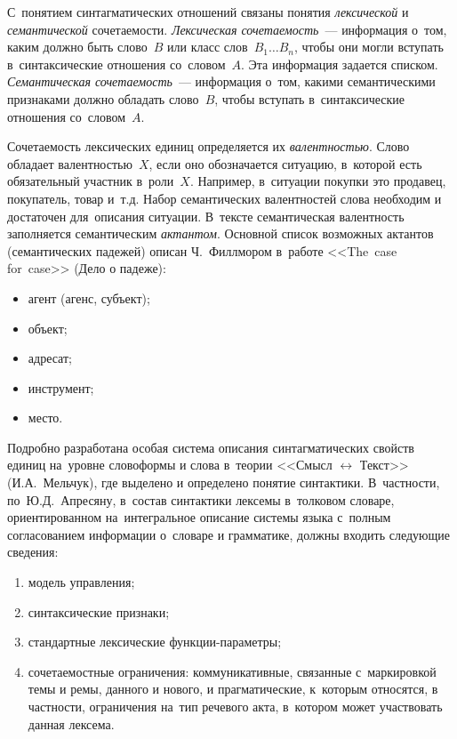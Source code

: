 \documentclass[12pt]{article}
\theoremstyle{definition}
\theoremstyle{remark}
\numberwithin{equation}{section}
\begin{document}
С~понятием синтагматических отношений связаны понятия \textsl{лексической}
и \textsl{семантической} сочетаемости. \textsl{Лексическая сочетаемость}~---
информация о~том, каким должно быть слово~$B$ или класс слов~$B_1 \dots B_n$,
чтобы они могли вступать в~синтаксические отношения со~словом~$A$.
Эта информация задается списком. \textsl{Семантическая сочетаемость}~---
информация о~том, какими семантическими признаками должно обладать
слово~$B$, чтобы вступать в~синтаксические отношения со~словом~$A$.

Сочетаемость лексических единиц определяется их \textsl{валентностью}.
Слово обладает валентностью~$X$, если оно обозначается ситуацию, в~которой
есть обязательный участник в~роли~$X$. Например, в~ситуации покупки
это продавец, покупатель, товар и~т.д. Набор семантических валентностей
слова необходим и достаточен для~описания ситуации. В~тексте
семантическая валентность заполняется семантическим \textsl{актантом}.
Основной список возможных актантов (семантических падежей) описан
Ч.~Филлмором в~работе <<The~case for~case>> (Дело о падеже):
\begin{itemize}
	\item агент (агенс, субъект);
	\item объект;
	\item адресат;
	\item инструмент;
	\item место.
\end{itemize}

Подробно разработана особая система описания синтагматических
свойств единиц на~уровне словоформы и слова в~теории
<<Смысл $\leftrightarrow$ Текст>> (И.А.~Мельчук), где выделено
и определено понятие синтактики. В~частности, по~Ю.Д.~Апресяну,
в~состав синтактики лексемы в~толковом словаре, ориентированном
на~интегральное описание системы языка с~полным согласованием
информации о~словаре и грамматике, должны входить следующие сведения:
\begin{enumerate}
	\item модель управления;
	\item синтаксические признаки;
	\item стандартные лексические функции\nobreakdash-параметры;
	\item сочетаемостные ограничения: коммуникативные, связанные
    с~маркировкой темы и ремы, данного и нового, и прагматические,
    к~которым относятся, в частности, ограничения на~тип речевого
    акта, в~котором может участвовать данная лексема.
\end{enumerate}
\end{document}
